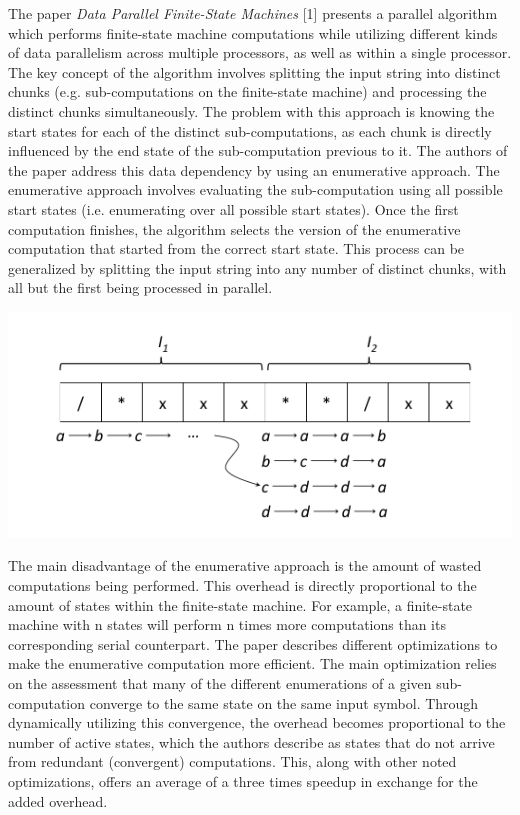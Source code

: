 \documentclass[11pt]{sigplanconf}
\begin{document}
The paper \textit{Data Parallel Finite-State Machines} [1] presents a parallel algorithm which performs finite-state machine computations while utilizing different kinds of data parallelism across multiple processors, as well as within a single processor. The key concept of the algorithm involves splitting the input string into distinct chunks (e.g. sub-computations on the finite-state machine) and processing the distinct chunks simultaneously. The problem with this approach is knowing the start states for each of the distinct sub-computations, as each chunk is directly influenced by the end state of the sub-computation previous to it. The authors of the paper address this data dependency by using an enumerative approach. The enumerative approach involves evaluating the sub-computation using all possible start states (i.e. enumerating over all possible start states). Once the first computation finishes, the algorithm selects the version of the enumerative computation that started from the correct start state. This process can be generalized by splitting the input string into any number of distinct chunks, with all but the first being processed in parallel.

\includegraphics[width=\linewidth]{enumerative_overview.png}

The main disadvantage of the enumerative approach is the amount of wasted computations being performed. This overhead is directly proportional to the amount of states within the finite-state machine. For example, a finite-state machine with n states will perform n times more computations than its corresponding serial counterpart. The paper describes different optimizations to make the enumerative computation more efficient. The main optimization relies on the assessment that many of the different enumerations of a given sub-computation converge to the same state on the same input symbol. Through dynamically utilizing this convergence, the overhead becomes proportional to the number of active states, which the authors describe as states that do not arrive from redundant (convergent) computations. This, along with other noted optimizations, offers an average of a three times speedup in exchange for the added overhead.
\end{document}
